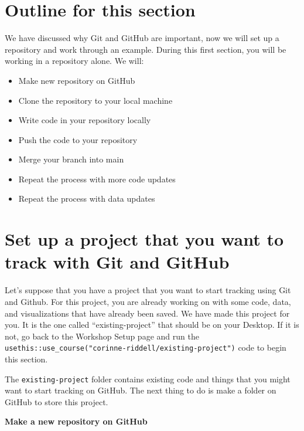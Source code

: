 \documentclass[
]{book}
\providecommand{\tightlist}{%
  \setlength{\itemsep}{0pt}\setlength{\parskip}{0pt}}
\begin{document}
\section{Outline for this section}\label{outline-for-this-section}

We have discussed why Git and GitHub are important, now we will set up a repository and work through an example. During this first section, you will be working in a repository alone. We will:

\begin{itemize}
\tightlist
\item
  Make new repository on GitHub\\
\item
  Clone the repository to your local machine\\
\item
  Write code in your repository locally\\
\item
  Push the code to your repository\\
\item
  Merge your branch into main
\item
  Repeat the process with more code updates
\item
  Repeat the process with data updates
\end{itemize}

\section{Set up a project that you want to track with Git and GitHub}\label{set-up-a-project-that-you-want-to-track-with-git-and-github}

Let's suppose that you have a project that you want to start tracking using Git
and Github. For this project, you are already working on with some code, data,
and visualizations that have already been saved. We have made this project for you.
It is the one called ``existing-project'' that should be on your Desktop. If it is
not, go back to the Workshop Setup page and run the \texttt{usethis::use\_course("corinne-riddell/existing-project")} code to begin this section.

The \texttt{existing-project} folder contains existing code and things that you might
want to start tracking on GitHub. The next thing to do is make a folder on
GitHub to store this project.

\textbf{Make a new repository on GitHub}
\end{document}
